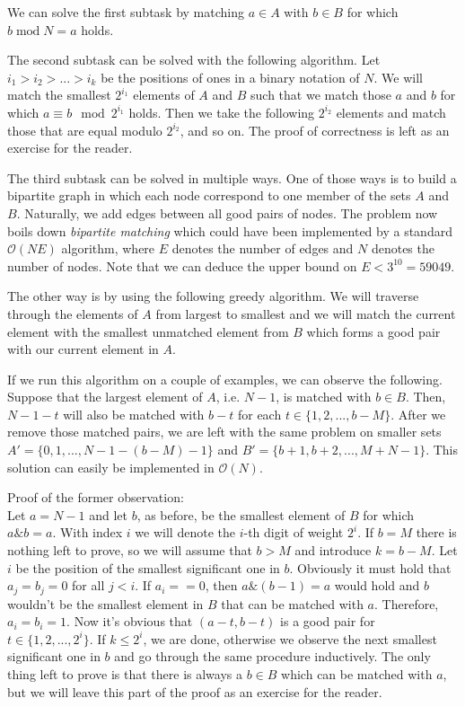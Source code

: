 \documentclass[a4paper]{article}
\begin{document}
We can solve the first subtask by matching $a \in A$ with $b \in B$ for which
$b \mathbin{\textrm{mod}} N = a$ holds.

The second subtask can be solved with the following algorithm. Let
$i_1 > i_2 > ... > i_k$ be the positions of ones in a binary notation
of $N$. We will match the smallest $2^{i_1}$ elements of $A$ and $B$ such that
we match those $a$ and $b$ for which $a \equiv b \mod 2^{i_1}$ holds. Then we
take the following $2^{i_2}$ elements and match those that are equal modulo
$2^{i_2}$, and so on. The proof of correctness is left as an exercise for the
reader.

The third subtask can be solved in multiple ways. One of those ways is to
build a bipartite graph in which each node correspond to one member of the
sets $A$ and $B$. Naturally, we add edges between all good pairs of nodes. The
problem now boils down \emph{bipartite matching} which could have been
implemented by a standard $\mathcal{O}(NE)$ algorithm, where $E$ denotes the
number of edges and $N$ denotes the number of nodes. Note that we can deduce
the upper bound on $E < 3^{10} = 59049$.

The other way is by using the following greedy algorithm. We will traverse
through the elements of $A$ from largest to smallest and we will match the
current element with the smallest unmatched element from $B$ which forms a
good pair with our current element in $A$.

If we run this algorithm on a couple of examples, we can observe the following.
Suppose that the largest element of $A$, i.e. $N - 1$, is matched with $b \in B$.
Then, $N - 1 - t$ will also be matched with $b - t$ for each
$t \in \{1, 2, ..., b - M\}$. After we remove those matched pairs, we are left
with the same problem on smaller sets $A' = \{0, 1, ..., N - 1 - (b - M) - 1\}$
and $B' = \{b + 1, b + 2, ..., M + N - 1\}$. This solution can easily be
implemented in $\mathcal{O}(N)$.

Proof of the former observation:\\
Let $a = N - 1$ and let $b$, as before, be the smallest element of $B$ for which
$a \mathbin\& b = a$. With index $i$ we will denote the $i$-th digit of weight
$2^i$. If $b = M$ there is nothing left to prove, so we will assume that
$b > M$ and introduce $k = b - M$. Let $i$ be the position of the smallest
significant one in $b$. Obviously it must hold that $a_j = b_j = 0$ for all
$j < i$. If $a_i == 0$, then $a \mathbin\& (b - 1) = a$ would hold and $b$
wouldn't be the smallest element in $B$ that can be matched with $a$. Therefore,
$a_i = b_i = 1$. Now it's obvious that $(a - t, b - t)$ is a good pair for
$t \in \{1, 2, ..., 2^i\}$. If $k \leq 2^i$, we are done, otherwise we observe
the next smallest significant one in $b$ and go through the same procedure
inductively. The only thing left to prove is that there is always a $b \in B$
which can be matched with $a$, but we will leave this part of the proof as
an exercise for the reader.
\end{document}
